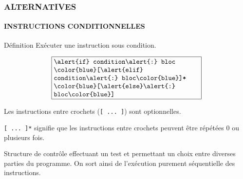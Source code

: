 \begin{frame}
\frametitle{\uppercase{Alternatives}}
\framesubtitle{\uppercase{Instructions conditionnelles}}
\begin{block}{Définition}
Exécuter une instruction sous condition.

$$\fbox{\begin{minipage}{7.5cm}\tt
\alert{if} condition\alert{:} bloc\\
\ {\color{blue}[}\alert{elif} condition\alert{:} bloc{\color{blue}]*}\\
\ {\color{blue}[}\alert{else}\alert{:} bloc{\color{blue}]}
\end{minipage}}$$

\begin{center}\footnotesize
Les instructions entre crochets ({\tt {\color{blue}[} ... {\color{blue}]}}) sont optionnelles.

\mbox{\tt{\color{blue}[} ... {\color{blue}]*}} signifie que les instructions entre crochets
peuvent être répétées 0 ou plusieurs fois.
\end{center}
\end{block}

Structure de contrôle effectuant un test et permettant un choix entre diverses 
parties du programme.
On sort ainsi de l'exécution purement séquentielle des instructions.
\end{frame}
